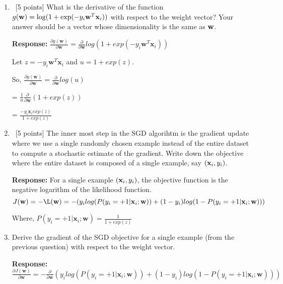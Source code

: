 \begin{enumerate}
\item~[5 points] What is the derivative of the function
  $g({\bf w})=\log(1+\exp(-y_i {\bf w}^T{\bf x}_i))$ with respect to the weight vector? Your
  answer should be a vector whose dimensionality is the same as ${\bf w}$.
	
	\textbf{Response:} \hspace{3cm} $\frac{\partial g(\textbf{w})}{\partial \textbf{w}} = \frac{\partial}{\partial \textbf{w}} log(1+exp(-y_i \textbf{w}^T \textbf{x}_i))$ \newline
	
	\hspace{5cm} Let $z = -y_i \textbf{w}^T \textbf{x}_i$ and $u = 1+exp(z)$.
	
	\hspace{5cm} So, \hspace{1cm} $\frac{\partial g(\textbf{w})}{\partial \textbf{w}} = \frac{\partial}{\partial \textbf{w}} log(u)$
	
	\hspace{8cm} = $\frac{1}{u} \frac{\partial}{\partial \textbf{w}} (1+exp(z))$
	
	\hspace{8cm} = $\frac{-y_i \textbf{x}_i exp(z)}{1+exp(z)}$
	
\item~[5 points] The inner most step in the SGD algorihtm is the gradient update
  where we use a single randomly chosen example instead of the entire dataset to
  compute a stochastic estimate of the gradient.  Write down the objective where
  the entire dataset is composed of a single example, say $({\bf x}_i, y_i)$.

	\textbf{Response:} For a single example $({\bf x}_i, y_i)$, the objective function is the negative logarithm of the likelihood function. 
	$$J(\textbf{w}) = -\L(\textbf{w}) = -(y_i log(P(y_i = +1 | \textbf{x}_i;\textbf{w}))+(1-y_i)log(1-P(y_i = +1 | \textbf{x}_i;\textbf{w})))$$
	
	\hspace{4cm} Where, $P(y_i = +1 | \textbf{x}_i;\textbf{w}) = \frac{1}{1+exp(z)}$

\item\relax[5 points] Derive the gradient of the SGD objective for a single
  example (from the previous question) with respect to the weight vector.
	
	\textbf{Response:} $\frac{\partial J(\textbf{w})}{\partial \textbf{w}} = -\frac{\partial}{\partial \textbf{w}} (y_i log(P(y_i = +1 | \textbf{x}_i;\textbf{w}))+(1-y_i)log(1-P(y_i = +1 | \textbf{x}_i;\textbf{w})))$
	

\end{enumerate}
